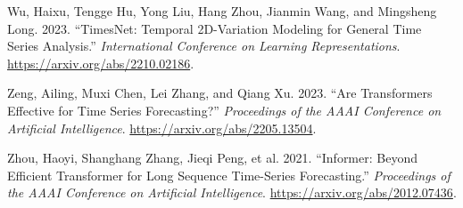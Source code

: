 \begin{CSLReferences}{1}{1}
Wu, Haixu, Tengge Hu, Yong Liu, Hang Zhou, Jianmin Wang, and Mingsheng
Long. 2023. {``TimesNet: Temporal 2D-Variation Modeling for General Time
Series Analysis.''} \emph{International Conference on Learning
Representations}. \url{https://arxiv.org/abs/2210.02186}.

Zeng, Ailing, Muxi Chen, Lei Zhang, and Qiang Xu. 2023. {``Are
Transformers Effective for Time Series Forecasting?''} \emph{Proceedings
of the AAAI Conference on Artificial Intelligence}.
\url{https://arxiv.org/abs/2205.13504}.

Zhou, Haoyi, Shanghang Zhang, Jieqi Peng, et al. 2021. {``Informer:
Beyond Efficient Transformer for Long Sequence Time-Series
Forecasting.''} \emph{Proceedings of the AAAI Conference on Artificial
Intelligence}. \url{https://arxiv.org/abs/2012.07436}.

\end{CSLReferences}
